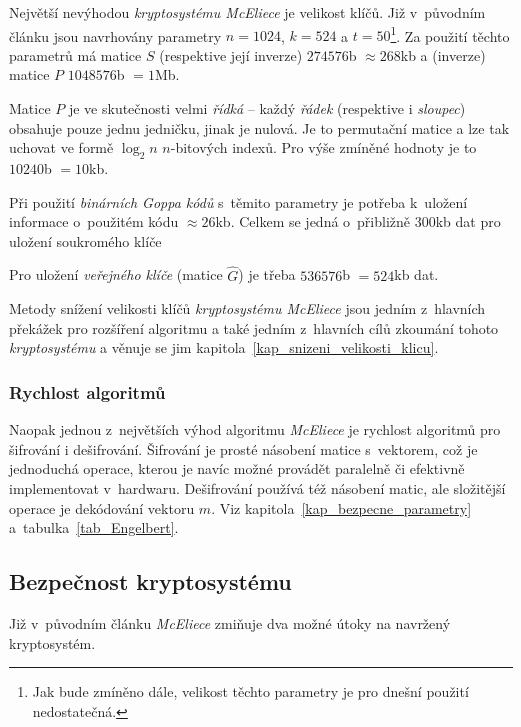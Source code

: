 \documentclass[thesis=M,czech,hidelinks]{FITthesis}[2012/06/26]
\newcommand{\0}{{\textcolor[gray]{0.80}{0}}}
\begin{document}
Největší nevýhodou \emph{kryptosystému McEliece} je velikost klíčů. Již
v~původním článku jsou navrhovány parametry $n=1024$, $k=524$ a $t=50$\footnote{
    Jak bude zmíněno dále, velikost těchto parametry je pro dnešní použití
    nedostatečná.
}. Za použití těchto parametrů má matice $S$ (respektive její inverze)
$274576$\;b $\approx 268$\;kb a (inverze) matice $P$ $1048576$\;b $= 1$\;Mb.

Matice $P$ je ve skutečnosti velmi \emph{řídká} -- každý \emph{řádek}
(respektive i \emph{sloupec}) obsahuje pouze jednu jedničku, jinak je nulová. Je
to permutační matice a lze tak uchovat ve formě $\log_2 n$ $n$-bitových indexů.
Pro výše zmíněné hodnoty je to $10240$\;b $=10$\;kb.

Při použití \emph{binárních Goppa kódů} s~těmito parametry je potřeba k~uložení
informace o~použitém kódu $\approx 26$\;kb. Celkem se jedná o~přibližně
$300$\;kb dat pro uložení soukromého klíče

Pro uložení \emph{veřejného klíče} (matice $\hat{G}$) je třeba $536576$\;b
$=524$\;kb dat.

Metody snížení velikosti klíčů \emph{kryptosystému McEliece} jsou jedním
z~hlavních překážek pro rozšíření algoritmu a také jedním z~hlavních cílů
zkoumání tohoto \emph{kryptosystému} a věnuje se jim
kapitola~\ref{kap_snizeni_velikosti_klicu}.

\subsubsection{Rychlost algoritmů}

Naopak jednou z~největších výhod algoritmu \emph{McEliece} je rychlost algoritmů
pro šifrování i dešifrování. Šifrování je prosté násobení matice s~vektorem, což
je jednoduchá operace, kterou je navíc možné provádět paralelně či efektivně
implementovat v~hardwaru. Dešifrování používá též násobení matic, ale složitější
operace je dekódování vektoru $\hat{m}$. Viz
kapitola~\ref{kap_bezpecne_parametry} a~tabulka~\ref{tab_Engelbert}.

\subsection{Bezpečnost kryptosystému}\label{kap_bezpecnost}

Již v~původním článku \cite{McEliece} \emph{McEliece} zmiňuje dva možné útoky na
navržený kryptosystém.
\end{document}
